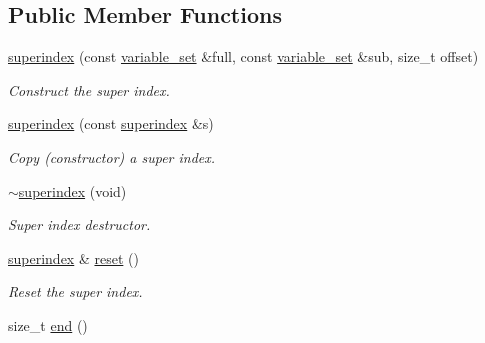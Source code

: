 \subsection*{Public Member Functions}
\begin{DoxyCompactItemize}
\item 
\hypertarget{classmerlin_1_1superindex_a9fdcd5396269adc20332a46f8e0e33e8}{}\hyperlink{classmerlin_1_1superindex_a9fdcd5396269adc20332a46f8e0e33e8}{superindex} (const \hyperlink{classmerlin_1_1variable__set}{variable\+\_\+set} \&full, const \hyperlink{classmerlin_1_1variable__set}{variable\+\_\+set} \&sub, size\+\_\+t offset)\label{classmerlin_1_1superindex_a9fdcd5396269adc20332a46f8e0e33e8}

\begin{DoxyCompactList}\small\item\em Construct the super index. \end{DoxyCompactList}\item 
\hypertarget{classmerlin_1_1superindex_a6ca2a8c735a9542940509299e5d0f4b2}{}\hyperlink{classmerlin_1_1superindex_a6ca2a8c735a9542940509299e5d0f4b2}{superindex} (const \hyperlink{classmerlin_1_1superindex}{superindex} \&s)\label{classmerlin_1_1superindex_a6ca2a8c735a9542940509299e5d0f4b2}

\begin{DoxyCompactList}\small\item\em Copy (constructor) a super index. \end{DoxyCompactList}\item 
\hypertarget{classmerlin_1_1superindex_a9b59da9851840bc5520c8eea0816a2cf}{}\hyperlink{classmerlin_1_1superindex_a9b59da9851840bc5520c8eea0816a2cf}{$\sim$superindex} (void)\label{classmerlin_1_1superindex_a9b59da9851840bc5520c8eea0816a2cf}

\begin{DoxyCompactList}\small\item\em Super index destructor. \end{DoxyCompactList}\item 
\hypertarget{classmerlin_1_1superindex_ac938f63832e550b87d1aae7ca766b423}{}\hyperlink{classmerlin_1_1superindex}{superindex} \& \hyperlink{classmerlin_1_1superindex_ac938f63832e550b87d1aae7ca766b423}{reset} ()\label{classmerlin_1_1superindex_ac938f63832e550b87d1aae7ca766b423}

\begin{DoxyCompactList}\small\item\em Reset the super index. \end{DoxyCompactList}\item 
\hypertarget{classmerlin_1_1superindex_a351aded45129c5b3737bf87d6ab860f1}{}size\+\_\+t \hyperlink{classmerlin_1_1superindex_a351aded45129c5b3737bf87d6ab860f1}{end} ()\label{classmerlin_1_1superindex_a351aded45129c5b3737bf87d6ab860f1}


\end{DoxyCompactItemize}
